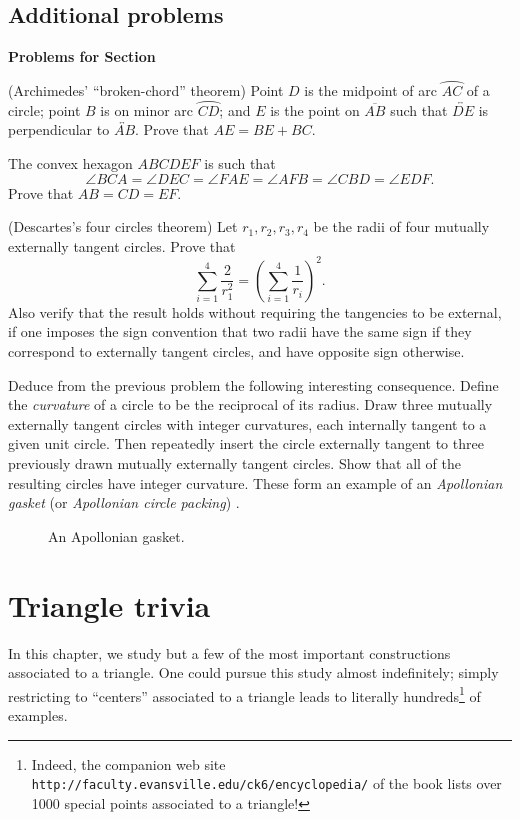 \documentclass[12pt]{book}
\newcounter{exc}
\numberwithin{exc}{section}
\numberwithin{figure}{section}
\newenvironment{exer}{\vspace{0.1in}
\noindent \textbf{Problems for Section~\thesection} \vspace{0.1in}
\begin{list}{\arabic{exc}.}{\usecounter{exc}}}{\end{list}}
\numberwithin{equation}{theorem}
\def\ii{\item}
\def\ang{\angle}
\def\line#1{\overleftrightarrow{#1}}
\def\seg#1{\overline{#1}}
\def\arc#1{\wideparen{#1}}
\begin{document}
\section{Additional problems}
\begin{exer}
\ii %
(Archimedes' ``broken-chord'' theorem)
Point $D$ is the midpoint of arc $\arc{AC}$ of a circle; point $B$ is on minor 
arc $\arc{CD}$; and $E$ is the point on $\seg{AB}$ such that 
$\line{DE}$ is perpendicular 
to $\line{AB}$. Prove that $AE = BE + BC$.
\ii \label{ex:convex}
The convex hexagon $ABCDEF$ is such that
\[
\angle BCA = \ang DEC = \ang FAE = \ang AFB = \ang CBD = \ang EDF.
\]
Prove that $AB = CD = EF$.
\ii
(Descartes's four circles theorem)
Let $r_1,r_2,r_3,r_4$ be the radii of four mutually externally
tangent circles. Prove that
\[
\sum_{i=1}^4 \frac{2}{r_1^2} = \left( \sum_{i=1}^4 \frac{1}{r_i} \right)^2.
\]
Also verify that the 
result holds without requiring the tangencies to be external,
if one imposes the sign convention that two radii have the same sign if they
correspond to externally tangent circles, and have opposite sign
otherwise.
\ii
Deduce from the previous problem the following interesting consequence.
Define the \emph{curvature} of a circle to be the reciprocal of its radius.
Draw three mutually externally tangent circles with integer curvatures,
each internally tangent to a given unit circle.
Then repeatedly insert
the circle externally tangent to three previously drawn mutually externally
tangent circles. Show that all of the resulting circles have integer
curvature. These form an example of an \emph{Apollonian gasket}
(or \emph{Apollonian circle packing}) .
\begin{figure}[ht]
\caption{An Apollonian gasket.}
\end{figure}
\end{exer}

\chapter{Triangle trivia}
\label{chap:triangle}

In this chapter, we study but a few of the most important constructions
associated to a triangle. One could pursue this study almost indefinitely;
simply restricting to ``centers'' associated to a triangle leads to
literally hundreds\footnote{Indeed,
the companion web site
\texttt{http://faculty.evansville.edu/ck6/encyclopedia/} of the
book \cite{bib:kimberling} lists over 1000
special points associated to a triangle!}
of examples.
\end{document}
